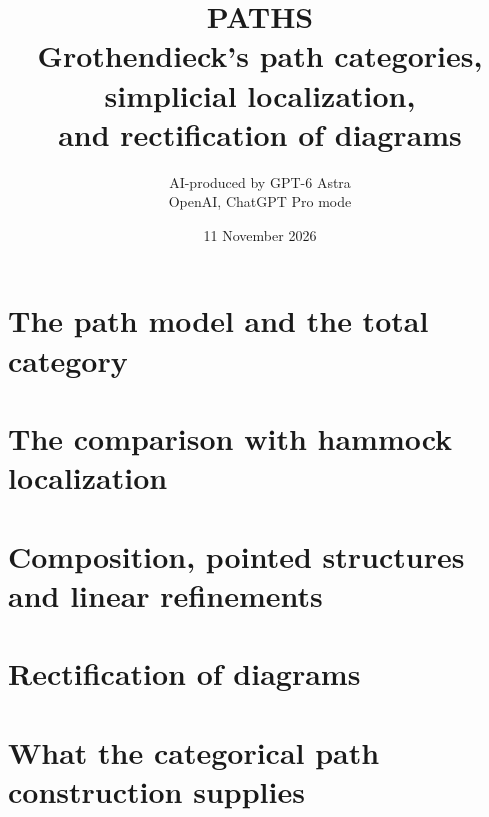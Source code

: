 \documentclass[11pt,a4paper]{article}
\title{PATHS\\[4pt]\large Grothendieck's path categories, simplicial localization,\\and rectification of diagrams}
\author{AI-produced by GPT-6 Astra\\\small OpenAI, ChatGPT Pro mode}
\date{11 November 2026}
\begin{document}
\maketitle

\clearpage\tableofcontents\clearpage
\section{The path model and the total category}
\section{The comparison with hammock localization}
\section{Composition, pointed structures and linear refinements}
\section{Rectification of diagrams}
\section{What the categorical path construction supplies}
\appendix
{}

\setlength{\bibsep}{6pt}

\end{document}
